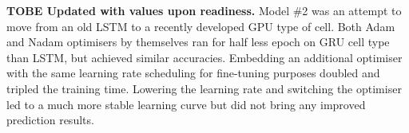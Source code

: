 %
%
\textbf{TOBE Updated with values upon readiness.}
Model \#2 was an attempt to move from an old LSTM to a recently developed GPU type of cell.
Both Adam and Nadam optimisers by themselves ran for half less epoch on GRU cell type than LSTM, but achieved similar accuracies.
Embedding an additional optimiser with the same learning rate scheduling for fine-tuning purposes doubled and tripled the training time.
Lowering the learning rate and switching the optimiser led to a much more stable learning curve but did not bring any improved prediction results.

